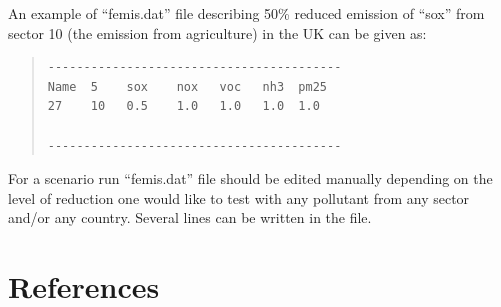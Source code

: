 \documentclass[a4paper,12pt]{report}
\begin{document}
An example of ``femis.dat'' file describing 50\% reduced emission of
``sox'' from sector 10 (the emission from agriculture) in the UK can be given as:  
\begin{quote}
\begin{verbatim}
-----------------------------------------
Name  5    sox    nox   voc   nh3  pm25 
27    10   0.5    1.0   1.0   1.0  1.0   

-----------------------------------------
\end{verbatim}        
\end{quote}
For a scenario run ``femis.dat'' file should be edited 
manually depending on the level of
reduction one would like to test with any pollutant from any sector
and/or any country. Several lines can be written in the file.

\chapter*{References}
\label{ch:References}
\end{document}
